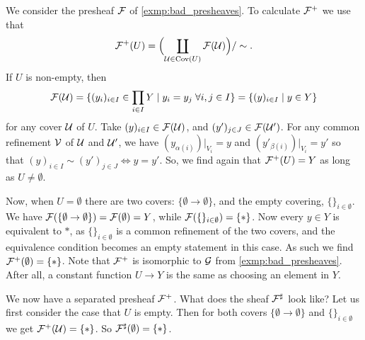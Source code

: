 \documentclass{article}
\DeclareMathOperator{\Cov}{Cov}
\begin{document}
\begin{example}
    We consider the presheaf $\mathcal{F}$ of \cref{exmp:bad_presheaves}.
    To calculate $\mathcal{F}^+$ we use that
    \begin{equation*}
        \mcF^+(U) = \Bigl(\coprod\limits_{\mcU \in \Cov(U)}\mcF(\mcU)\Bigr)/ \sim.
    \end{equation*}
    If $U$ is non-empty, then
    \begin{equation*}
        \mathcal{F}(\mathcal{U}) = \{(y_i)_{i\in I}\in \prod_{i\in I} Y \mid y_i = y_j\; \forall i,j \in I\}
        = \{(y)_{i\in I}\mid y\in Y\}
    \end{equation*}
    for any cover $\mathcal{U}$ of $U$. Take $(y)_{i\in I} \in \mathcal{F}(\mathcal{U})$, and
    $(y')_{j\in J} \in \mathcal{F}(\mathcal{U}')$. For any common refinement $\mathcal{V}$ of
    $\mathcal{U}$ and $\mathcal{U}'$, we have $(y_{\alpha(i)})|_{V_i} = y$ and $(y'_{\beta(i)})|_{V_i} = y'$
    so that $(y)_{i\in I} \sim (y')_{j\in J} \iff y = y'$.
    So, we find again that $\mathcal{F}^+(U) = Y$ as long as $U \neq \emptyset$.

    Now, when $U = \emptyset$ there are two covers: $\{\emptyset \to \emptyset\}$,
    and the empty covering, $\{\}_{i\in \emptyset}$. We have
    $\mathcal{F}(\{\emptyset \to \emptyset\}) = \mathcal{F}(\emptyset) = Y$,
    while $\mathcal{F}(\{\}_{i\in \emptyset}) = \{*\}$.
    Now every $y\in Y$ is equivalent to $*$, as $\{\}_{i\in \emptyset}$
    is a common refinement of the two covers, and the equivalence
    condition becomes an empty statement in this case. As such we find
    $\mathcal{F}^+(\emptyset) = \{*\}$.
    Note that $\mathcal{F}^+$ is isomorphic to $\mathcal{G}$ from \cref{exmp:bad_presheaves}.
    After all, a constant function $U \to Y$ is the same
    as choosing an element in $Y$.

    We now have a separated presheaf $\mathcal{F}^+$. What does the sheaf
    $\mathcal{F}^\sharp$ look like? Let us first consider the case that $U$
    is empty. Then for both covers $\{\emptyset \to \emptyset\}$ and
    $\{\}_{i\in \emptyset}$ we get $\mathcal{F}^+(\mathcal{U}) = \{*\}$.
    So $\mathcal{F}^\sharp(\emptyset) = \{*\}$.


\end{example}
\end{document}
